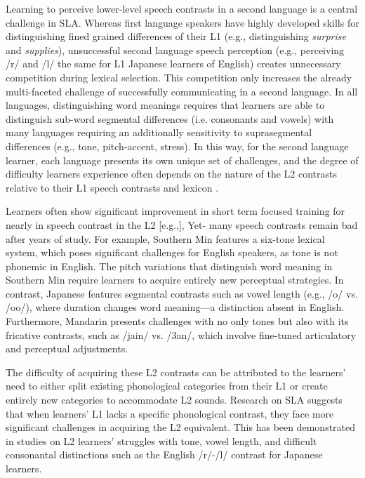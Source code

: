 Learning to perceive lower-level speech contrasts in a second language is a central challenge in SLA. Whereas first language speakers have highly developed skills for distinguishing fined grained differences of their L1 (e.g., distinguishing \textit{surprise} and \textit{supplies}), unsuccessful second language speech perception (e.g., perceiving /r/ and /l/ the same for L1 Japanese learners of English) creates unnecessary competition during lexical selection. This competition only increases the already multi-faceted challenge of successfully communicating in a second language. In all languages, distinguishing word meanings requires that learners are able to distinguish sub-word segmental differences (i.e. consonants and vowels) with many languages requiring an additionally sensitivity to suprasegmental differences (e.g., tone, pitch-accent, stress). In this way, for the second language learner, each language presents its own unique set of challenges, and the degree of difficulty learners experience often depends on the nature of the L2 contrasts relative to their L1 speech contrasts and lexicon \parencite{Flege1995,Best1995,BestTyler2007}.

Learners often show significant improvement in short term focused training for nearly in speech contrast in the L2 [e.g.,]{}, Yet- many speech contrasts remain bad after years of study. For example, Southern Min features a six-tone lexical system, which poses significant challenges for English speakers, as tone is not phonemic in English. The pitch variations that distinguish word meaning in Southern Min require learners to acquire entirely new perceptual strategies. In contrast, Japanese features segmental contrasts such as vowel length (e.g., /o/ vs. /oo/), where duration changes word meaning—a distinction absent in English. Furthermore, Mandarin presents challenges with no only tones but also with its fricative contrasts, such as /jain/ vs. /3an/, which involve fine-tuned articulatory and perceptual adjustments.

The difficulty of acquiring these L2 contrasts can be attributed to the learners’ need to either split existing phonological categories from their L1 or create entirely new categories to accommodate L2 sounds. Research on SLA suggests that when learners' L1 lacks a specific phonological contrast, they face more significant challenges in acquiring the L2 equivalent. This has been demonstrated in studies on L2 learners' struggles with tone, vowel length, and difficult consonantal distinctions such as the English /r/-/l/ contrast for Japanese learners.

